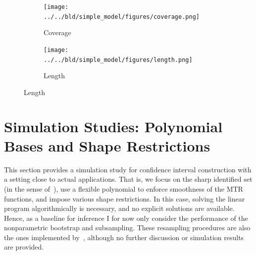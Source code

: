 \documentclass[12pt,a4paper,english]{article} %
\numberwithin{equation}{section}
\theoremstyle{definition}
\theoremstyle{remark}
\theoremstyle{plain}
\begin{document}
\begin{figure}

  \caption{Monte Carlo Simulation: Simple Kink Example}\label{fig:sims_simple_model}

  \centering
  \begin{subfigure}[b]{0.49\textwidth}
      \centering
      \texttt{[image: ../../bld/simple\_model/figures/coverage.png]}
      \caption{Coverage}\label{fig:sims_simple_model_coverage}
  \end{subfigure}
  \hfill
  \begin{subfigure}[b]{0.49\textwidth}
      \centering
      \texttt{[image: ../../bld/simple\_model/figures/length.png]}
      \caption{Length}\label{fig:sims_simple_model_length}
  \end{subfigure}



\end{figure}


\section{Simulation Studies: Polynomial Bases and Shape Restrictions}\label{sec:simulation_studies}
This section provides a simulation study for confidence interval construction with a setting close to actual applications.
That is, we focus on the sharp identified set (in the sense of~\cite{mogstad2018using}), use a flexible polynomial to enforce smoothness of the MTR functions, and impose various shape restrictions.
In this case, solving the linear program algorithmically is necessary, and no explicit solutions are available.
Hence, as a baseline for inference I for now only consider the performance of the nonparametric bootstrap and subsampling.
These resampling procedures are also the ones implemented by~\cite{shea2023ivmte}, although no further discussion or simulation results are provided.
\end{document}
